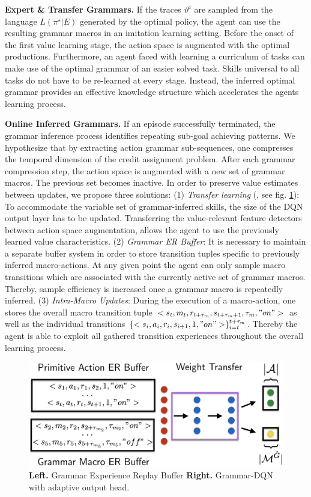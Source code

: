 \documentclass[10pt,letterpaper]{article}
\begin{document}
\textbf{Expert \& Transfer Grammars.} If the traces $\vartheta^i$ are sampled from the language $L(\pi^\star|E)$ generated by the optimal policy, the agent can use the resulting grammar macros in an imitation learning setting. Before the onset of the first value learning stage, the action space is augmented with the optimal productions. Furthermore, an agent faced with learning a curriculum of tasks can make use of the optimal grammar of an easier solved task. Skills universal to all tasks do not have to be re-learned at every stage. Instead, the inferred optimal grammar provides an effective knowledge structure which accelerates the agents learning process.

\textbf{Online Inferred Grammars.} If an episode successfully terminated, the grammar inference process identifies repeating sub-goal achieving patterns. We hypothesize that by extracting action grammar sub-sequences, one compresses the temporal dimension of the credit assignment problem. After each grammar compression step, the action space is augmented with a new set of grammar macros. The previous set becomes inactive. 
In order to preserve value estimates between updates, we propose three solutions:
(1) \textit{Transfer learning} (, see fig. \ref{fig:online_ag_dqn}): To accommodate the variable set of grammar-inferred skills, the size of the DQN output layer has to be updated. Transferring the value-relevant feature detectors between action space augmentation, allows the agent to use the previously learned value characteristics.
(2) \textit{Grammar ER Buffer}: It is necessary to maintain a separate buffer system in order to store transition tuples specific to previously inferred macro-actions. At any given point the agent can only sample macro transitions which are associated with the currently active set of grammar macros. Thereby, sample efficiency is increased once a grammar macro is repeatedly inferred.
(3) \textit{Intra-Macro Updates}: During the execution of a macro-action, one stores the overall macro transition tuple $<s_t,m_t,r_{t +\tau_m}, s_{t +\tau_m +1}, \tau_m, "on">$ as well as the individual transitions $\{<s_i,a_i,r_i, s_{i+1}, 1, "on">\}_{i=t}^{t + \tau_m}$. Thereby the agent is able to exploit all gathered transition experiences throughout the overall learning process.

\begin{figure}[H]
    \includegraphics[width=\linewidth]{figures/ag_dqn_buffer}
    \caption{\textbf{Left.} Grammar Experience Replay Buffer \textbf{Right.} Grammar-DQN with adaptive output head.}
  \label{fig:online_ag_dqn}
\end{figure}
    
\end{document}
